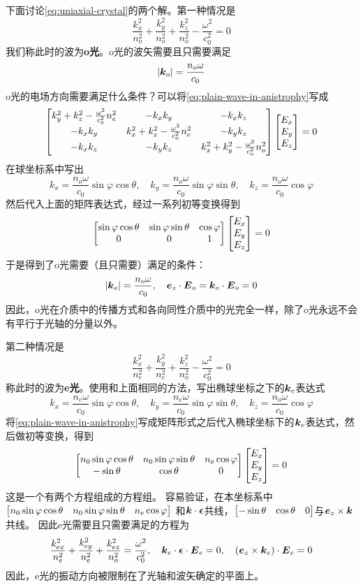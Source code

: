 \documentclass[UTF8, a4paper]{ctexart}
\begin{document}
下面讨论\eqref{eq:uniaxial-crystal}的两个解。第一种情况是
\[
    \frac{k_x^2}{n_o^2} + \frac{k_y^2}{n_o^2} + \frac{k_z^2}{n_o^2} - \frac{\omega^2}{c_0^2} = 0
\]
我们称此时的波为\textbf{o光}。o光的波矢需要且只需要满足
\[
    \abs{\vb*{k}_o} = \frac{n_o \omega}{c_0}
\]
o光的电场方向需要满足什么条件？可以将\eqref{eq:plain-wave-in-anistrophy}写成
\[
    \bmqty{
        k_y^2 + k_z^2 - \frac{\omega^2}{c_0^2} n_e^2 & -k_x k_y & - k_x k_z \\
        - k_x k_y & k_x^2 + k_z^2 - \frac{\omega^2}{c_0^2} n_e^2 & -k_y k_z \\
        -k_x k_z & -k_y k_z & k_x^2 + k_y^2 - \frac{\omega^2}{c_0^2} n_o^2
    }
    \bmqty{
        E_x \\ E_y \\ E_z
    } = 0
\]
在球坐标系中写出
\[
    k_x = \frac{n_o \omega}{c_0} \sin \varphi \cos \theta, 
    \quad k_y = \frac{n_o \omega}{c_0} \sin \varphi \sin \theta, \quad k_z = \frac{n_o \omega}{c_0} \cos \varphi
\]
然后代入上面的矩阵表达式，经过一系列初等变换得到
\[
    \bmqty{
        \sin \varphi \cos \theta & \sin \varphi \sin \theta & \cos \varphi \\
        0 & 0 & 1
    }
    \bmqty{E_x \\ E_y \\ E_z} = 0
\]
于是得到了o光需要（且只需要）满足的条件：
\begin{equation}
    \abs{\vb*{k}_o} = \frac{n_o \omega}{c_0}, \quad\vb*{e}_z \cdot \vb*{E}_o = \vb*{k}_o \cdot \vb*{E}_o = 0
    \label{eq:o-light}
\end{equation}
因此，o光在介质中的传播方式和各向同性介质中的光完全一样，除了o光永远不会有平行于光轴的分量以外。

第二种情况是
\[
    \frac{k_x^2}{n_e^2} + \frac{k_y^2}{n_e^2} + \frac{k_z^2}{n_o^2} - \frac{\omega^2}{c_0^2} = 0
\]
称此时的波为\textbf{e光}。使用和上面相同的方法，写出椭球坐标之下的$\vb*{k}_e$表达式
\[
    k_x = \frac{n_e \omega}{c_0} \sin \varphi \cos \theta, \quad k_y = \frac{n_e \omega}{c_0} \sin \varphi \sin \theta, \quad k_z = \frac{n_o \omega}{c_0} \cos \varphi
\]
将\eqref{eq:plain-wave-in-anistrophy}写成矩阵形式之后代入椭球坐标下的$\vb*{k}_e$表达式，然后做初等变换，得到
\[
    \bmqty{
        n_0 \sin \varphi \cos \theta & n_0 \sin \varphi \sin \theta & n_e \cos \varphi \\
        -\sin \theta & \cos \theta & 0
    }
    \bmqty{E_x \\ E_y \\ E_z} = 0
\]
这是一个有两个方程组成的方程组。
容易验证，在本坐标系中$\bmqty{n_0 \sin \varphi \cos \theta & n_0 \sin \varphi \sin \theta & n_e \cos \varphi}$
和$\vb*{k} \cdot \vb*{\epsilon}$共线，$\bmqty{-\sin \theta & \cos \theta & 0}$与$\vb*{e}_z \times \vb*{k}$共线。
因此e光需要且只需要满足的方程为
\begin{equation}
    \frac{k_{ex}^2}{n_e^2} + \frac{k_{ey}^2}{n_e^2} + \frac{k_{ez}^2}{n_o^2} =
    \frac{\omega^2}{c_0^2}, \quad \vb*{k}_e \cdot \vb*{\epsilon} \cdot \vb*{E}_e = 0, \quad (\vb*{e}_z \times \vb*{k}_e) \cdot \vb*{E}_e = 0
    \label{eq:e-light}
\end{equation}
因此，e光的振动方向被限制在了光轴和波矢确定的平面上。
\end{document}
